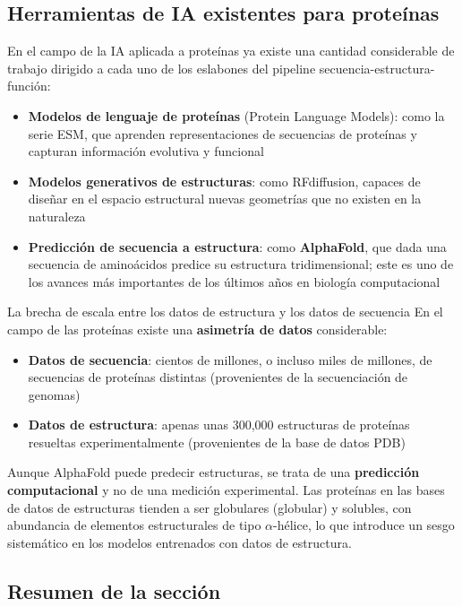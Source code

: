\subsection{Herramientas de IA existentes para proteínas}

En el campo de la IA aplicada a proteínas ya existe una cantidad considerable de trabajo dirigido a cada uno de los eslabones del pipeline secuencia-estructura-función:

\begin{itemize}
    \item \textbf{Modelos de lenguaje de proteínas} (Protein Language Models): como la serie ESM, que aprenden representaciones de secuencias de proteínas y capturan información evolutiva y funcional
    \item \textbf{Modelos generativos de estructuras}: como RFdiffusion, capaces de diseñar en el espacio estructural nuevas geometrías que no existen en la naturaleza
    \item \textbf{Predicción de secuencia a estructura}: como \textbf{AlphaFold}, que dada una secuencia de aminoácidos predice su estructura tridimensional; este es uno de los avances más importantes de los últimos años en biología computacional
\end{itemize}

\begin{warningbox}{La brecha de escala entre los datos de estructura y los datos de secuencia}
En el campo de las proteínas existe una \textbf{asimetría de datos} considerable:
\begin{itemize}
    \item \textbf{Datos de secuencia}: cientos de millones, o incluso miles de millones, de secuencias de proteínas distintas (provenientes de la secuenciación de genomas)
    \item \textbf{Datos de estructura}: apenas unas 300,000 estructuras de proteínas resueltas experimentalmente (provenientes de la base de datos PDB)
\end{itemize}
Aunque AlphaFold puede predecir estructuras, se trata de una \textbf{predicción computacional} y no de una medición experimental. Las proteínas en las bases de datos de estructuras tienden a ser globulares (globular) y solubles, con abundancia de elementos estructurales de tipo $\alpha$-hélice, lo que introduce un sesgo sistemático en los modelos entrenados con datos de estructura.
\end{warningbox}

\subsection{Resumen de la sección}

